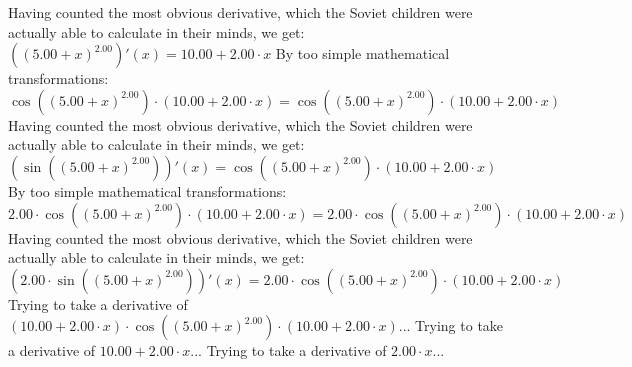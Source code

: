 \documentclass{article}
\begin{document}
 \newline
 \newline 
Having counted the most obvious derivative, which the Soviet children were actually able to calculate in their minds, we get:
$({\left({{5.00} + {x}}\right) ^ {2.00}})'(x) = {{10.00} + {{2.00} \cdot {x}}}$\newline
\newline
By too simple mathematical transformations:
 ${ \cos {\left({\left({{5.00} + {x}}\right) ^ {2.00}}\right)}  \cdot \left({{10.00} + {{2.00} \cdot {x}}}\right)} = { \cos {\left({\left({{5.00} + {x}}\right) ^ {2.00}}\right)}  \cdot \left({{10.00} + {{2.00} \cdot {x}}}\right)}$ 
 \newline
 \newline 
Having counted the most obvious derivative, which the Soviet children were actually able to calculate in their minds, we get:
$( \sin {\left({\left({{5.00} + {x}}\right) ^ {2.00}}\right)} )'(x) = { \cos {\left({\left({{5.00} + {x}}\right) ^ {2.00}}\right)}  \cdot \left({{10.00} + {{2.00} \cdot {x}}}\right)}$\newline
\newline
By too simple mathematical transformations:
 ${{2.00} \cdot { \cos {\left({\left({{5.00} + {x}}\right) ^ {2.00}}\right)}  \cdot \left({{10.00} + {{2.00} \cdot {x}}}\right)}} = {{2.00} \cdot { \cos {\left({\left({{5.00} + {x}}\right) ^ {2.00}}\right)}  \cdot \left({{10.00} + {{2.00} \cdot {x}}}\right)}}$ 
 \newline
 \newline 
Having counted the most obvious derivative, which the Soviet children were actually able to calculate in their minds, we get:
$({{2.00} \cdot  \sin {\left({\left({{5.00} + {x}}\right) ^ {2.00}}\right)} })'(x) = {{2.00} \cdot { \cos {\left({\left({{5.00} + {x}}\right) ^ {2.00}}\right)}  \cdot \left({{10.00} + {{2.00} \cdot {x}}}\right)}}$\newline
\newline
Trying to take a derivative of ${\left({{10.00} + {{2.00} \cdot {x}}}\right) \cdot { \cos {\left({\left({{5.00} + {x}}\right) ^ {2.00}}\right)}  \cdot \left({{10.00} + {{2.00} \cdot {x}}}\right)}}$...\newline
\newline
Trying to take a derivative of ${{10.00} + {{2.00} \cdot {x}}}$...\newline
\newline
Trying to take a derivative of ${{2.00} \cdot {x}}$...\newline
\newline
\end{document}
